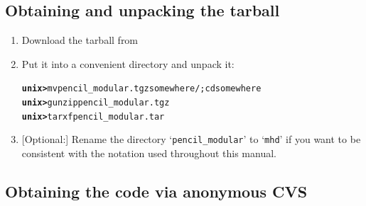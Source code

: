 \documentclass[12pt,twoside,notitlepage,a4paper]{article}
\newcommand{\prompt}[1]{{\ttfamily\bfseries{}#1}}
\newcommand{\file}[1]{`\texttt{#1}'}
\begin{document}

\subsection{Obtaining and unpacking the tarball}

\begin{enumerate}
\item Download the tarball from
\item Put it into a convenient directory and unpack it:
  \begin{alltt}
  \prompt{unix> } mv pencil_modular.tgz somewhere/; cd somewhere
  \prompt{unix> } gunzip pencil_modular.tgz
  \prompt{unix> } tar xf pencil_modular.tar \
  \end{alltt}
\item {}[Optional:] Rename the directory \file{pencil_modular} to \file{mhd}
  if you want to be consistent with the notation used throughout this
  manual.
\end{enumerate}


\subsection{Obtaining the code via anonymous CVS}
\end{document}
